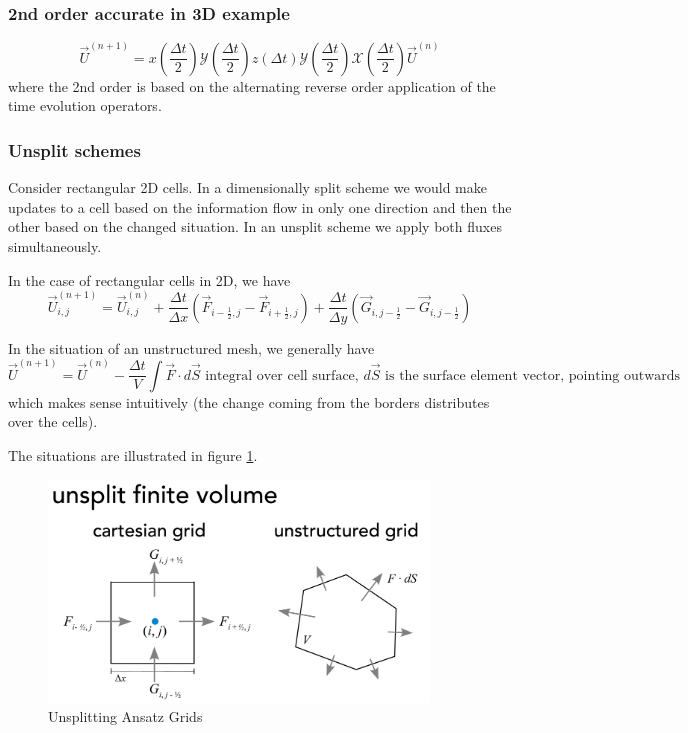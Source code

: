 \subsubsection{2nd order accurate in 3D example}
\begin{equation}
    \vec{U}^{(n+1)}=x\left(\frac{\Delta t}{2}\right) \mathcal{Y}\left(\frac{\Delta t}{2}\right) z(\Delta t) \mathcal{Y}\left(\frac{\Delta t}{2}\right) \mathcal{X}\left(\frac{\Delta t}{2}\right) \vec{U}^{(n)}
\end{equation}
where the 2nd order is based on the alternating reverse order application of
the time evolution operators.

\subsubsection{Unsplit schemes}
Consider rectangular 2D cells. In a dimensionally split scheme we would 
make updates to a cell based on the information flow in only one direction 
and then the other based on the changed situation. In an unsplit scheme we 
apply both fluxes simultaneously.

In the case of rectangular cells in 2D, we have
\begin{equation}
    \vec{U}_{i, j}^{(n+1)}=\vec{U}_{i, j}^{(n)}+\frac{\Delta t}{\Delta x}\left(\vec{F}_{i-\frac{1}{2}, j}-\vec{F}_{i+\frac{1}{2}, j}\right)+\frac{\Delta t}{\Delta y}\left(\vec{G}_{i, j-\frac{1}{2}}-\vec{G}_{i, j-\frac{1}{2}}\right)
\end{equation}

In the situation of an unstructured mesh, we generally have
\begin{equation}
    \vec{U}^{(n+1)}=\vec{U}^{(n)}-\frac{\Delta t}{V} \int \vec{F} \cdot d \vec{S} \text { integral over cell surface,  } d\vec{S} \text{ is the surface element vector, pointing outwards}
\end{equation}
which makes sense intuitively (the change coming from the
borders distributes over the cells).

The situations are illustrated in figure \ref{fig:usplit}.
\begin{figure}[htb!]
    \centering
    \includegraphics[width=0.9\textwidth]{figures/usplit.pdf}
    \caption{Unsplitting Ansatz Grids}
    \label{fig:usplit}
\end{figure}

